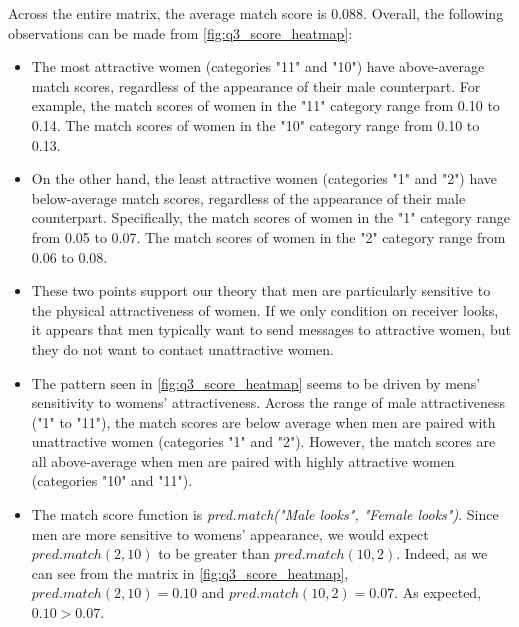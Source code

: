 Across the entire matrix, the average match score is 0.088. Overall, the following observations can be made from \cref{fig:q3_score_heatmap}:
\begin{itemize}
\item The most attractive women (categories "11" and "10") have above-average match scores, regardless of the appearance of their male counterpart. For example, the match scores of women in the "11" category range from 0.10 to 0.14. The match scores of women in the "10" category range from 0.10 to 0.13.

\item On the other hand, the least attractive women (categories "1" and "2") have below-average match scores, regardless of the appearance of their male counterpart. Specifically, the  match scores of women in the "1" category range from 0.05 to 0.07. The match scores of women in the "2" category range from 0.06 to 0.08.

\item These two points support our theory that men are particularly sensitive to the physical attractiveness of women. If we only condition on receiver looks, it appears that men typically want to send messages to attractive women, but they do not want to contact unattractive women.

\item The pattern seen in \cref{fig:q3_score_heatmap} seems to be driven by mens' sensitivity to womens' attractiveness. Across the range of male attractiveness ("1" to "11"), the match scores are below average when men are paired with unattractive women (categories "1" and "2"). However, the match scores are all above-average when men are paired with highly attractive women (categories "10" and "11").

\item The match score function is \textit{pred.match("Male looks", "Female looks")}. Since men are more sensitive to womens' appearance, we would expect $pred.match(2,10)$ to be greater than $pred.match(10,2)$. Indeed, as we can see from the matrix in \cref{fig:q3_score_heatmap}, $pred.match(2,10) = 0.10$ and $pred.match(10,2) = 0.07$. As expected, $0.10 > 0.07$.

\end{itemize}


